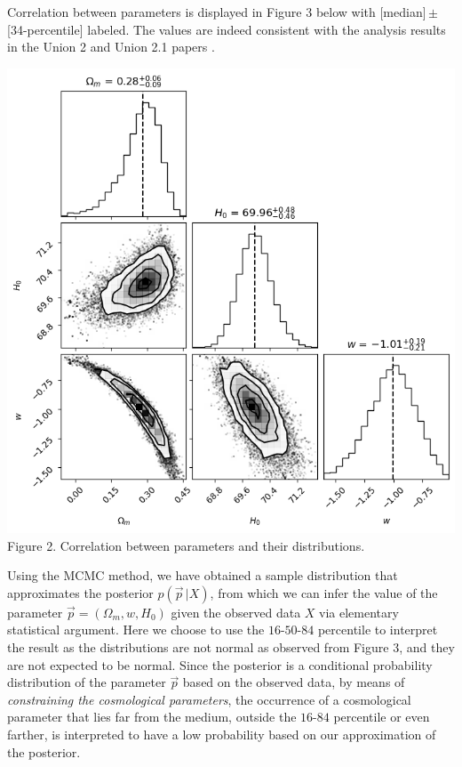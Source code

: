 \documentclass[11pt]{article}
\theoremstyle{break}
\theoremstyle{break}
\begin{document}
${}$\qquad Correlation between parameters is displayed in Figure 3 below with [median]\,$\pm $\,[34-percentile] labeled. The values are indeed consistent with the analysis results in the Union 2 and Union 2.1 papers \cite{U21, U2}. \\

\begin{center}
\includegraphics[scale=0.65]{mcmc2}\\
Figure 2. Correlation between parameters and their distributions.
\end{center}

${}$\qquad Using the MCMC method, we have obtained a sample distribution that approximates the posterior $p(\vec{p}\,|X)$, from which we can infer the value of the parameter $\vec{p} = (\Omega_m, w, H_0)$ given the observed data $X$ via elementary statistical argument. Here we choose to use the $16$-$50$-$84$ percentile to interpret the result as the distributions are not normal as observed from Figure 3, and they are not expected to be normal. Since the posterior is a conditional probability distribution of the parameter $\vec{p}$ based on the observed data, by means of \textit{constraining the cosmological parameters}, the occurrence of a cosmological parameter that lies far from the medium, outside the $16$-$84$ percentile or even farther, is interpreted to have a low probability based on our approximation of the posterior.  \\
\end{document}
